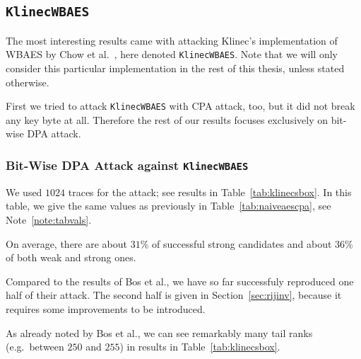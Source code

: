 \subsection{\tt KlinecWBAES}
\label{sec:klinecwbaes}

The most interesting results came with attacking Klinec's implementation \cite{klinec2013implementation} of WBAES by Chow et al.\ \cite{chow2002aes}, here denoted {\tt KlinecWBAES}. Note that we will only consider this particular implementation in the rest of this thesis, unless stated otherwise.

First we tried to attack {\tt KlinecWBAES} with CPA attack, too, but it did not break any key byte at all. Therefore the rest of our results focuses exclusively on bit-wise DPA attack.

\subsubsection{Bit-Wise DPA Attack against {\tt KlinecWBAES}}
	
	We used $1024$ traces for the attack; see results in Table~\ref{tab:klinecsbox}. In this table, we give the same values as previously in Table~\ref{tab:naiveaescpa}, see Note~\ref{note:tabvals}.
	
	
	On average, there are about $31\%$ of successful strong candidates and about $36\%$ of both weak and strong ones.
	
	Compared to the results of Bos et al., we have so far successfuly reproduced one half of their attack. The second half is given in Section~\ref{sec:rijinv}, because it requires some improvements to be introduced.
	
	\begin{note}
	\label{note:tailrank}
		As already noted by Bos et al., we can see remarkably many tail ranks (e.g.\ between $250$ and $255$) in results in Table~\ref{tab:klinecsbox}.
	\end{note}




